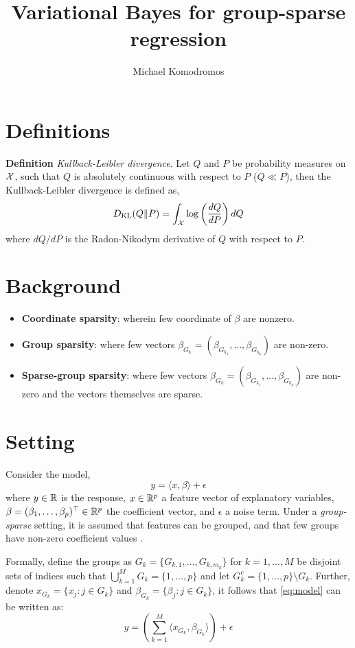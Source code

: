 \documentclass[12pt]{article}
\author{Michael Komodromos}
\title{Variational Bayes for group-sparse regression}
\begin{document}
\maketitle

\section{Definitions}
\textbf{Definition} \textit{Kullback-Leibler divergence}. Let $Q$ and $P$ be probability measures on $\mathcal{X}$, such that $ Q $ is absolutely continuous with respect to $P$ ($Q \ll P$), then the Kullback-Leibler divergence is defined as,
\begin{equation}\label{eq:kl}
D_\text{KL}(Q \| P) = \int_{\mathcal{X}} \log \left( \frac{dQ}{dP} \right) dQ
\end{equation}
where $dQ/dP$ is the Radon-Nikodym derivative of $Q$ with respect to $P$.


\section{Background}
\begin{itemize}
    \itemsep1pt
    \item \textbf{Coordinate sparsity}: wherein few coordinate of $\beta$ are nonzero.
    \item \textbf{Group sparsity}: where few vectors $\beta_{G_k} = (\beta_{G_{k_1}}, \dots, \beta_{G_{k_p}})$ are non-zero.
    \item \textbf{Sparse-group sparsity}: where few vectors $\beta_{G_k} = (\beta_{G_{k_1}}, \dots, \beta_{G_{k_p}})$ are non-zero and the vectors themselves are sparse.
\end{itemize}


\section{Setting}

Consider the model,
\begin{equation} \label{eq:model} 
    y = \langle x, \beta \rangle + \epsilon
\end{equation}
where $y \in \mathbb{R}$ is the response, $x \in \mathbb{R}^p$ a feature vector of explanatory variables, $\beta = (\beta_1, \dots, \beta_p)^\top \in \mathbb{R}^p$ the coefficient vector, and $\epsilon$ a noise term. Under a \textit{group-sparse} setting, it is assumed that features can be grouped, and that few groups have non-zero coefficient values
\citep{Giraud2021}. 

Formally, define the groups as $G_k = \{ G_{k,1}, \dots, G_{k, m_k} \}$ for $k=1,\dots,M$ be disjoint sets of indices such that $ \bigcup_{k=1}^M G_k = \{1, \dots, p \}$ and let $G_k^c = \{1,\dots, p \} \setminus G_k$. Further, denote $x_{G_k} = \{x_j : j \in G_k \}$ and $\beta_{G_k} = \{\beta_j : j \in G_k \}$, it follows that \eqref{eq:model} can be written as:
\begin{equation}
    y = \left( \sum_{k=1}^{M} \langle x_{G_k}, \beta_{G_k} \rangle \right) + \epsilon
\end{equation}
\end{document}

